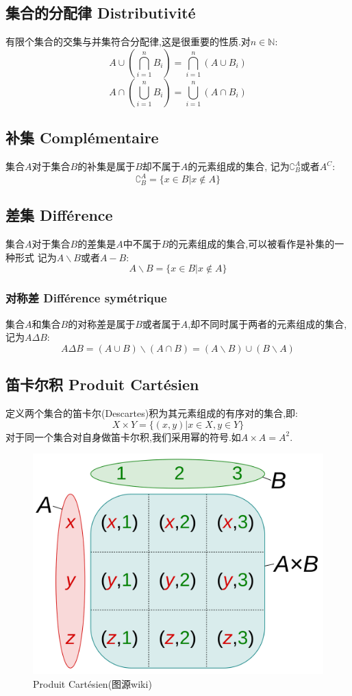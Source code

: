 \documentclass[12pt, a4paper, oneside]{ctexbook}
\begin{document}
  \subsection{集合的分配律 Distributivité}
  有限个集合的交集与并集符合分配律,这是很重要的性质.对$n\in\mathbb{N}$:
  $$
  A\cup(\bigcap_{i=1}^{n}B_i)=\bigcap_{i=1}^{n}(A\cup B_i)
  $$
  $$
  A\cap(\bigcup_{i=1}^{n}B_i)=\bigcup_{i=1}^{n}(A\cap B_i)
  $$
  \subsection{补集 Complémentaire}
  集合$A$对于集合$B$的补集是属于$B$却不属于$A$的元素组成的集合,
  记为$ \complement _B^A$或者$A^C$:
  $$
  \complement _B^A=\{x\in B | x\notin A\}
  $$
  \subsection{差集 Différence}
  集合$A$对于集合$B$的差集是$A$中不属于$B$的元素组成的集合,可以被看作是补集的一种形式
  记为$A\backslash B$或者$A-B$:
  $$
    A\backslash B=\{x\in B | x\notin A\}
  $$
  \subsubsection{对称差 Différence symétrique}
  集合$A$和集合$B$的对称差是属于$B$或者属于$A$,却不同时属于两者的元素组成的集合,
  记为$A\Delta B$:
  $$
    A\Delta B=(A\cup B)\backslash (A\cap B)=(A\backslash B)\cup(B\backslash A)
  $$

  \subsection{笛卡尔积 Produit Cartésien}
  定义两个集合的笛卡尔(Descartes)积为其元素组成的有序对的集合,即:
  $$
  X\times Y=\{(x,y)|x\in X,y\in Y\}
  $$对于同一个集合对自身做笛卡尔积,我们采用幂的符号.如$A\times A=A^2$.

  \begin{figure}[H]
    \centering
    \includegraphics[scale=0.05]{Produit_Cartesien.png}
    \caption{Produit Cartésien(图源wiki)}
    \label{myref:Produit_Cartesien}
  \end{figure}
\end{document}

